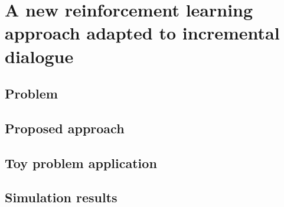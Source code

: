\chapter{A new reinforcement learning approach adapted to incremental dialogue}
\label{ch:theory}

\section{Problem}

\section{Proposed approach}

\section{Toy problem application}

\section{Simulation results}